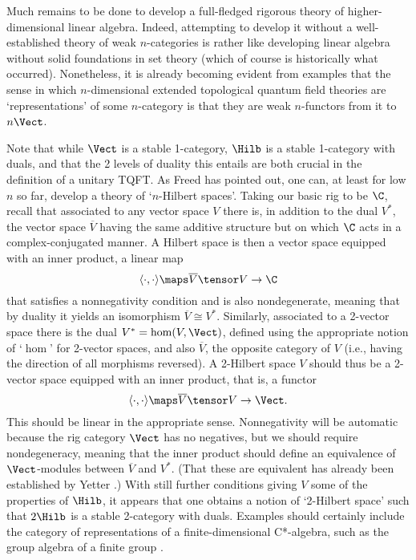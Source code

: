 Much remains to be done to develop a full-fledged rigorous theory
of higher-dimensional linear algebra.   Indeed, attempting to
develop it without a well-established theory of weak
$n$-categories is rather like developing linear algebra
without solid foundations in set theory (which of course is
historically what occurred).   Nonetheless, it is already
becoming evident from examples that the sense in which
$n$-dimensional extended topological quantum field theories are
`representations' of some $n$-category is that they are
weak $n$-functors from it to $n\Vect$.

Note that while $\Vect$ is a stable 1-category, $\Hilb$ is a
stable 1-category with duals, and that the 2 levels of duality
this entails are both crucial in the definition of a unitary
TQFT.   As Freed \cite{Freed} has pointed out, one can, at least
for low $n$ so far, develop a theory of `$n$-Hilbert spaces'.
Taking our basic rig to be $\C$, recall that associated to any
vector space $V$ there is, in addition to the dual $V^\ast$, the
vector space $\overline V$ having the same additive structure but
on which $\C$ acts in a complex-conjugated manner.  A Hilbert
space is then a vector space equipped with an inner product, a
linear map
\[     \langle \cdot,\cdot \rangle \maps \overline V \tensor V \to
\C \]
that satisfies a nonnegativity condition and is also
nondegenerate, meaning that by duality it yields an isomorphism
$\overline V \cong V^\ast$.  Similarly, associated to  a 2-vector
space there is the dual $V^\ast =  \hom(V,\Vect)$, defined using
the appropriate notion of `$\hom$' for 2-vector spaces,
and also $\overline V$, the opposite category of
$V$ (i.e., having the direction of all morphisms reversed).   A
2-Hilbert space $V$ should thus be a 2-vector space equipped with
an inner product, that is, a functor
\[     \langle \cdot,\cdot
\rangle \maps \overline V \tensor V \to \Vect .\]
This should be
linear in the appropriate sense.  Nonnegativity will be automatic
because the rig category $\Vect$ has no negatives, but we should
require nondegeneracy, meaning that the inner product should
define an equivalence of $\Vect$-modules between $\overline V$
and $V^\ast$.   (That these are equivalent has already been established by
Yetter \cite{Yetter2}.)  With still further conditions giving
$V$ some of the properties of $\Hilb$, it
appears that one obtains a notion of `2-Hilbert space' such that
$2\Hilb$ is a stable 2-category with duals.  Examples should certainly
include the category of representations of a finite-dimensional
C*-algebra, such as the group algebra of a finite group
\cite{Freed}.

